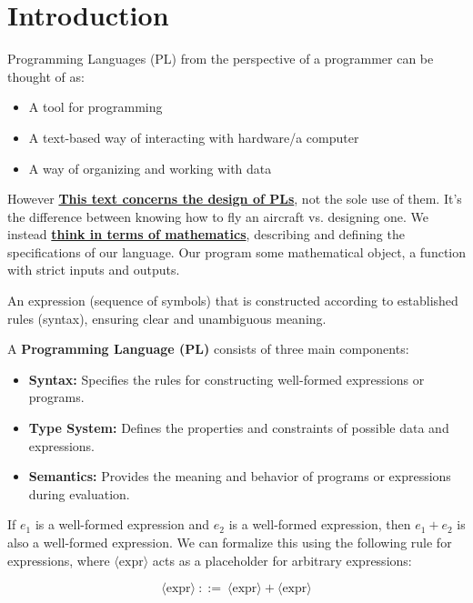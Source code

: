\section{Introduction}

Programming Languages (PL) from the perspective of a programmer can be thought of as:
\begin{itemize}
    \item  A tool for programming
    \item A text-based way of interacting
    with hardware/a computer
    \item A way of organizing and working
    with data
\end{itemize}

However \textbf{\underline{This text concerns the design of 
PLs}}, not the sole use of them. It's the difference between knowing how to fly 
an aircraft vs. designing one.
We instead \textbf{\underline{think in terms of mathematics}}, describing and defining
the specifications of our language. Our program some mathematical object,
a function with strict inputs and outputs.
\begin{Def}

    An expression (sequence of symbols) that is constructed according to established rules (syntax),
    ensuring clear and unambiguous meaning.

\end{Def}
\begin{Def}

    A \textbf{Programming Language (PL)} consists of three main components:
    \begin{itemize}
        \item \textbf{Syntax:} Specifies the rules for constructing well-formed expressions or programs.
        \item \textbf{Type System:} Defines the properties and constraints of possible data and expressions.
        \item \textbf{Semantics:} Provides the meaning and behavior of programs or expressions during evaluation.
    \end{itemize}
\end{Def}

\vspace{-1em}
\begin{Example}

    \label{ex:well_formed_expr}
    If $e_1$ is a well-formed expression and $e_2$ is a well-formed expression, 
    then $e_1 + e_2$ is also a well-formed expression. We can formalize this using the following rule for expressions, 
    where $\langle \text{expr} \rangle$ acts as a placeholder for arbitrary expressions:

    \[
    \langle \text{expr} \rangle \ ::= \ \langle \text{expr} \rangle + \langle \text{expr} \rangle
    \]
\end{Example}


